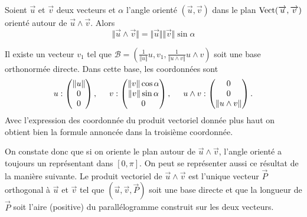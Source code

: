 \begin{propn}
 Soient $\overrightarrow u$ et $\overrightarrow v$ deux vecteurs et $\alpha$ l'angle orienté $(\overrightarrow u , \overrightarrow v)$ dans le plan $\mathop{\mathrm{Vect}}(\overrightarrow u , \overrightarrow v)$ orienté autour de $\overrightarrow u \wedge \overrightarrow v$. Alors
\begin{displaymath}
 \Vert \overrightarrow u \wedge \overrightarrow v\Vert =
 \Vert \overrightarrow u \Vert  \Vert\overrightarrow v\Vert \sin \alpha
\end{displaymath}
\end{propn}
\begin{demo}
 Il existe un vecteur $v_1$ tel que $\mathcal{B} = (\frac{1}{\Vert u\Vert}u, v_1 , \frac{1}{\Vert u\wedge v \Vert} u\wedge v)$ soit une base orthonormée directe. Dans cette base, les coordonnées sont
 \[
  u: 
  \begin{pmatrix}
   \Vert u\Vert \\ 0 \\ 0
  \end{pmatrix}
, \hspace{0.5cm}
  v: 
  \begin{pmatrix}
   \Vert v\Vert \cos \alpha \\ \Vert v\Vert \sin \alpha  \\ 0
  \end{pmatrix}
, \hspace{0.5cm}
u \wedge v : 
\begin{pmatrix}
 0 \\ 0 \\ \Vert u\wedge v\Vert
\end{pmatrix}.
 \]
Avec l'expression des coordonnée du produit vectoriel donnée plus haut on obtient bien la formule annoncée dans la troisième coordonnée.
\end{demo}
\begin{rem}
 On constate donc que si on oriente le plan autour de $\overrightarrow u \wedge \overrightarrow v$, l'angle orienté a toujours un représentant dans $[0,\pi]$. On peut se représenter aussi ce résultat de la manière suivante. Le produit vectoriel de $\overrightarrow u \wedge \overrightarrow v$ est l'unique vecteur $\overrightarrow P$ orthogonal à $\overrightarrow u$ et $\overrightarrow v$ tel que $(\overrightarrow u, \overrightarrow v, \overrightarrow P)$ soit une base directe et que la longueur de $\overrightarrow P$ soit l'aire (positive) du parallélogramme construit sur les deux vecteurs.
\end{rem}
